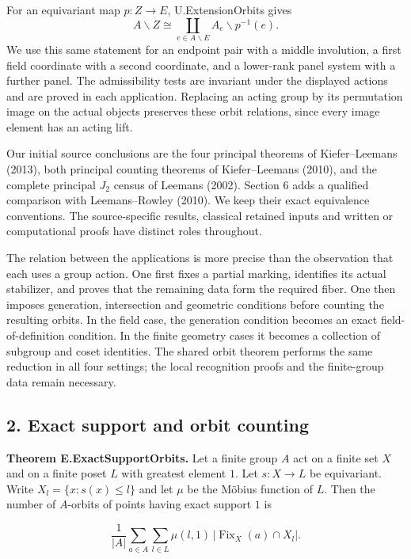 \documentclass[
  11pt,
  a4paper,
]{article}
\begin{document}
For an equivariant map \(p:Z\to E\), U.ExtensionOrbits gives \[
A\backslash Z\cong\coprod_{e\in A\backslash E}A_e\backslash p^{-1}(e).
\tag{E0}
\] We use this same statement for an endpoint pair with a middle
involution, a first field coordinate with a second coordinate, and a
lower-rank panel system with a further panel. The admissibility tests
are invariant under the displayed actions and are proved in each
application. Replacing an acting group by its permutation image on the
actual objects preserves these orbit relations, since every image
element has an acting lift.

Our initial source conclusions are the four principal theorems of
Kiefer--Leemans (2013), both principal counting theorems of
Kiefer--Leemans (2010), and the complete principal \(J_2\) census of
Leemans (2002). Section 6 adds a qualified comparison with
Leemans--Rowley (2010). We keep their exact equivalence conventions. The
source-specific results, classical retained inputs and written or
computational proofs have distinct roles throughout.

The relation between the applications is more precise than the
observation that each uses a group action. One first fixes a partial
marking, identifies its actual stabilizer, and proves that the remaining
data form the required fiber. One then imposes generation, intersection
and geometric conditions before counting the resulting orbits. In the
field case, the generation condition becomes an exact
field-of-definition condition. In the finite geometry cases it becomes a
collection of subgroup and coset identities. The shared orbit theorem
performs the same reduction in all four settings; the local recognition
proofs and the finite-group data remain necessary.

\subsection{2. Exact support and orbit
counting}\label{exact-support-and-orbit-counting}

\textbf{Theorem E.ExactSupportOrbits.} Let a finite group \(A\) act on a
finite set \(X\) and on a finite poset \(L\) with greatest element
\(1\). Let \(s:X\to L\) be equivariant. Write \(X_l=\{x:s(x)\le l\}\)
and let \(\mu\) be the Möbius function of \(L\). Then the number of
\(A\)-orbits of points having exact support \(1\) is

\[
\frac1{|A|}\sum_{a\in A}\sum_{l\in L}
\mu(l,1)\,|\operatorname{Fix}_X(a)\cap X_l|.
\tag{E1}
\]
\end{document}
